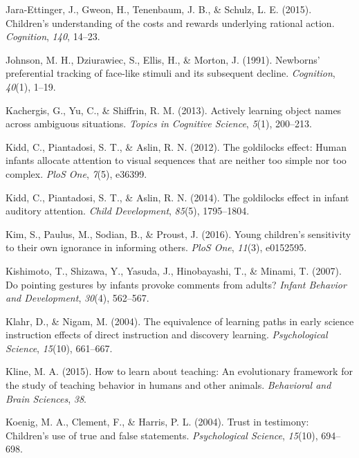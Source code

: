 \documentclass[english,floatsintext,man]{apa6}
\theoremstyle{definition}
\theoremstyle{definition}
\theoremstyle{definition}
\theoremstyle{remark}
\begin{document}
\hypertarget{ref-jara2015children}{}
Jara-Ettinger, J., Gweon, H., Tenenbaum, J. B., \& Schulz, L. E. (2015).
Children's understanding of the costs and rewards underlying rational
action. \emph{Cognition}, \emph{140}, 14--23.

\hypertarget{ref-johnson1991newborns}{}
Johnson, M. H., Dziurawiec, S., Ellis, H., \& Morton, J. (1991).
Newborns' preferential tracking of face-like stimuli and its subsequent
decline. \emph{Cognition}, \emph{40}(1), 1--19.

\hypertarget{ref-kachergis2013actively}{}
Kachergis, G., Yu, C., \& Shiffrin, R. M. (2013). Actively learning
object names across ambiguous situations. \emph{Topics in Cognitive
Science}, \emph{5}(1), 200--213.

\hypertarget{ref-kidd2012goldilocks}{}
Kidd, C., Piantadosi, S. T., \& Aslin, R. N. (2012). The goldilocks
effect: Human infants allocate attention to visual sequences that are
neither too simple nor too complex. \emph{PloS One}, \emph{7}(5),
e36399.

\hypertarget{ref-kidd2014goldilocks}{}
Kidd, C., Piantadosi, S. T., \& Aslin, R. N. (2014). The goldilocks
effect in infant auditory attention. \emph{Child Development},
\emph{85}(5), 1795--1804.

\hypertarget{ref-kim2016young}{}
Kim, S., Paulus, M., Sodian, B., \& Proust, J. (2016). Young children's
sensitivity to their own ignorance in informing others. \emph{PloS One},
\emph{11}(3), e0152595.

\hypertarget{ref-kishimoto2007pointing}{}
Kishimoto, T., Shizawa, Y., Yasuda, J., Hinobayashi, T., \& Minami, T.
(2007). Do pointing gestures by infants provoke comments from adults?
\emph{Infant Behavior and Development}, \emph{30}(4), 562--567.

\hypertarget{ref-klahr2004equivalence}{}
Klahr, D., \& Nigam, M. (2004). The equivalence of learning paths in
early science instruction effects of direct instruction and discovery
learning. \emph{Psychological Science}, \emph{15}(10), 661--667.

\hypertarget{ref-kline2015learn}{}
Kline, M. A. (2015). How to learn about teaching: An evolutionary
framework for the study of teaching behavior in humans and other
animals. \emph{Behavioral and Brain Sciences}, \emph{38}.

\hypertarget{ref-koenig2004trust}{}
Koenig, M. A., Clement, F., \& Harris, P. L. (2004). Trust in testimony:
Children's use of true and false statements. \emph{Psychological
Science}, \emph{15}(10), 694--698.
\end{document}
